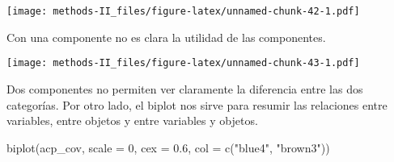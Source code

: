 \documentclass[
]{article}
\newenvironment{Shaded}{\begin{snugshade}}{\end{snugshade}}
\newcommand{\AttributeTok}[1]{\textcolor[rgb]{0.77,0.63,0.00}{#1}}
\newcommand{\DecValTok}[1]{\textcolor[rgb]{0.00,0.00,0.81}{#1}}
\newcommand{\FloatTok}[1]{\textcolor[rgb]{0.00,0.00,0.81}{#1}}
\newcommand{\FunctionTok}[1]{\textcolor[rgb]{0.00,0.00,0.00}{#1}}
\newcommand{\NormalTok}[1]{#1}
\newcommand{\OtherTok}[1]{\textcolor[rgb]{0.56,0.35,0.01}{#1}}
\newcommand{\SpecialCharTok}[1]{\textcolor[rgb]{0.00,0.00,0.00}{#1}}
\newcommand{\StringTok}[1]{\textcolor[rgb]{0.31,0.60,0.02}{#1}}
\begin{document}
\begin{Shaded}
\end{Shaded}

\begin{Shaded}
\end{Shaded}

\texttt{[image: methods-II\_files/figure-latex/unnamed-chunk-42-1.pdf]}

Con una componente no es clara la utilidad de las componentes.

\begin{Shaded}
\end{Shaded}

\texttt{[image: methods-II\_files/figure-latex/unnamed-chunk-43-1.pdf]}

Dos componentes no permiten ver claramente la diferencia entre las dos
categorías. Por otro lado, el biplot nos sirve para resumir las
relaciones entre variables, entre objetos y entre variables y objetos.

\begin{Shaded}
\begin{Highlighting}[]
\FunctionTok{biplot}\NormalTok{(acp\_cov, }\AttributeTok{scale =} \DecValTok{0}\NormalTok{, }\AttributeTok{cex =} \FloatTok{0.6}\NormalTok{, }\AttributeTok{col =} \FunctionTok{c}\NormalTok{(}\StringTok{"blue4"}\NormalTok{, }\StringTok{"brown3"}\NormalTok{))}
\end{Highlighting}
\end{Shaded}
\end{document}
